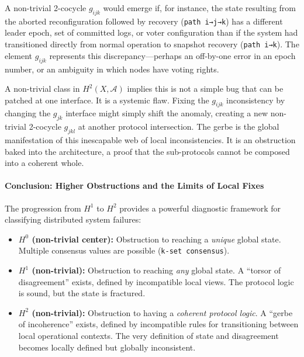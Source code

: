 \documentclass[
]{article}
\providecommand{\tightlist}{%
  \setlength{\itemsep}{0pt}\setlength{\parskip}{0pt}}
\begin{document}
A non-trivial 2-cocycle \(g_{ijk}\) would emerge if, for instance, the
state resulting from the aborted reconfiguration followed by recovery
(\texttt{path\ i→j→k}) has a different leader epoch, set of committed
logs, or voter configuration than if the system had transitioned
directly from normal operation to snapshot recovery
(\texttt{path\ i→k}). The element \(g_{ijk}\) represents this
discrepancy---perhaps an off-by-one error in an epoch number, or an
ambiguity in which nodes have voting rights.

A non-trivial class in \(H^2(X, \mathcal{A})\) implies this is not a
simple bug that can be patched at one interface. It is a systemic flaw.
Fixing the \(g_{ijk}\) inconsistency by changing the \(g_{jk}\)
interface might simply shift the anomaly, creating a new non-trivial
2-cocycle \(g_{jkl}\) at another protocol intersection. The gerbe is the
global manifestation of this inescapable web of local inconsistencies.
It is an obstruction baked into the architecture, a proof that the
sub-protocols cannot be composed into a coherent whole.

\paragraph{Conclusion: Higher Obstructions and the Limits of Local
Fixes}\label{conclusion-higher-obstructions-and-the-limits-of-local-fixes}

The progression from \(H^1\) to \(H^2\) provides a powerful diagnostic
framework for classifying distributed system failures:

\begin{itemize}
\tightlist
\item
  \textbf{\(H^0\) (non-trivial center):} Obstruction to reaching a
  \emph{unique} global state. Multiple consensus values are possible
  (\texttt{k-set\ consensus}).
\item
  \textbf{\(H^1\) (non-trivial):} Obstruction to reaching \emph{any}
  global state. A ``torsor of disagreement'' exists, defined by
  incompatible local views. The protocol logic is sound, but the state
  is fractured.
\item
  \textbf{\(H^2\) (non-trivial):} Obstruction to having a \emph{coherent
  protocol logic}. A ``gerbe of incoherence'' exists, defined by
  incompatible rules for transitioning between local operational
  contexts. The very definition of state and disagreement becomes
  locally defined but globally inconsistent.
\end{itemize}
\end{document}
